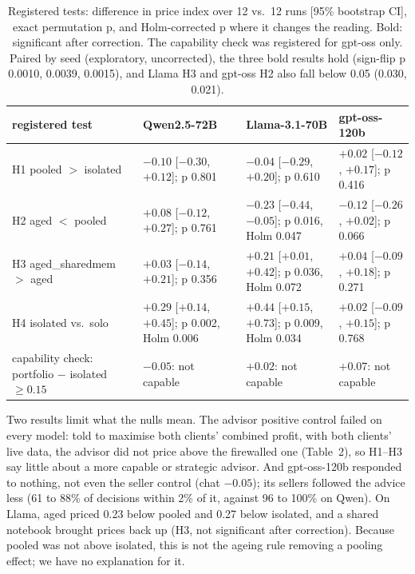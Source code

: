 \documentclass[11pt]{article}
\begin{document}
\begin{table}[t]
\centering\footnotesize
\begin{tabularx}{\textwidth}{@{}>{\raggedright\arraybackslash}p{2.75cm} L L L@{}}
\toprule
registered test & Qwen2.5-72B & Llama-3.1-70B & gpt-oss-120b \\
\midrule
H1 pooled $>$ isolated & $-0.10$ [$-0.30$, $+0.12$]; p 0.801 & $-0.04$ [$-0.29$, $+0.20$]; p 0.610 & $+0.02$ [$-0.12$, $+0.17$]; p 0.416 \\
H2 aged $<$ pooled & $+0.08$ [$-0.12$, $+0.27$]; p 0.761 & $\mathbf{-0.23}$ [$-0.44$, $-0.05$]; p 0.016, Holm 0.047 & $-0.12$ [$-0.26$, $+0.02$]; p 0.066 \\
H3 aged\_sharedmem $>$ aged & $+0.03$ [$-0.14$, $+0.21$]; p 0.356 & $+0.21$ [$+0.01$, $+0.42$]; p 0.036, Holm 0.072 & $+0.04$ [$-0.09$, $+0.18$]; p 0.271 \\
H4 isolated vs.\ solo & $\mathbf{+0.29}$ [$+0.14$, $+0.45$]; p 0.002, Holm 0.006 & $\mathbf{+0.44}$ [$+0.15$, $+0.73$]; p 0.009, Holm 0.034 & $+0.02$ [$-0.09$, $+0.15$]; p 0.768 \\
\addlinespace
capability check: portfolio $-$ isolated $\geq 0.15$ & $-0.05$: not capable & $+0.02$: not capable & $+0.07$: not capable \\
\bottomrule
\end{tabularx}
\caption{Registered tests: difference in price index over 12 vs.\ 12 runs [95\% bootstrap CI], exact permutation p, and Holm-corrected p where it changes the reading. Bold: significant after correction. The capability check was registered for gpt-oss only. Paired by seed (exploratory, uncorrected), the three bold results hold (sign-flip p 0.0010, 0.0039, 0.0015), and Llama H3 and gpt-oss H2 also fall below 0.05 (0.030, 0.021).}
\label{tab:tests}
\end{table}

Two results limit what the nulls mean. The advisor positive control failed on every model: told to maximise both clients' combined profit, with both clients' live data, the advisor did not price above the firewalled one (Table~2), so H1--H3 say little about a more capable or strategic advisor. And gpt-oss-120b responded to nothing, not even the seller control (chat $-0.05$); its sellers followed the advice less (61 to 88\% of decisions within 2\% of it, against 96 to 100\% on Qwen). On Llama, aged priced 0.23 below pooled and 0.27 below isolated, and a shared notebook brought prices back up (H3, not significant after correction). Because pooled was not above isolated, this is not the ageing rule removing a pooling effect; we have no explanation for it.
\end{document}
